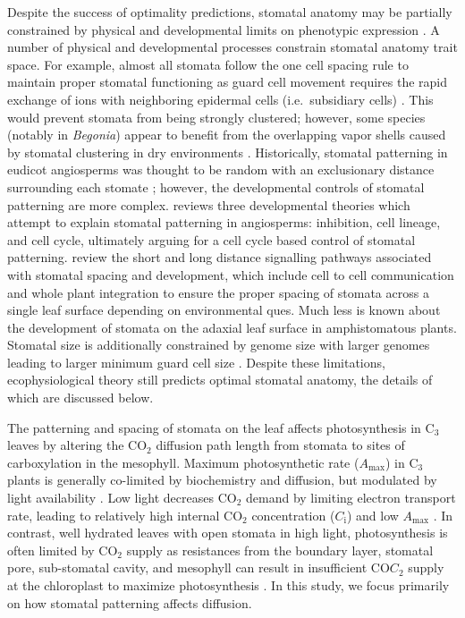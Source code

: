 \documentclass[webpdf,large,modern,unnumsec,namedate]{oup-authoring-template}
\begin{document}
Despite the success of optimality predictions, stomatal anatomy may be
partially constrained by physical and developmental limits on phenotypic
expression
\citep{croxdale_stomatal_2000, harrison_influence_2020, muir_how_2023}.
A number of physical and developmental processes constrain stomatal
anatomy trait space. For example, almost all stomata follow the one cell
spacing rule to maintain proper stomatal functioning as guard cell
movement requires the rapid exchange of ions with neighboring epidermal
cells (i.e.~subsidiary cells)
\citep{geisler_oriented_2000, dow_physiological_2014}. This would
prevent stomata from being strongly clustered; however, some species
(notably in \emph{Begonia}) appear to benefit from the overlapping vapor
shells caused by stomatal clustering in dry environments
\citep{yi_gan_stomatal_2010, lehmann_effects_2015, papanatsiou_stomatal_2017}.
Historically, stomatal patterning in eudicot angiosperms was thought to
be random with an exclusionary distance surrounding each stomate
\citep{sachs_developmental_1974}; however, the developmental controls of
stomatal patterning are more complex. \citet{croxdale_stomatal_2000}
reviews three developmental theories which attempt to explain stomatal
patterning in angiosperms: inhibition, cell lineage, and cell cycle,
ultimately arguing for a cell cycle based control of stomatal
patterning. \citet{pillitteri_mechanisms_2012} review the short and long
distance signalling pathways associated with stomatal spacing and
development, which include cell to cell communication and whole plant
integration to ensure the proper spacing of stomata across a single leaf
surface depending on environmental ques. Much less is known about the
development of stomata on the adaxial leaf surface in amphistomatous
plants. Stomatal size is additionally constrained by genome size with
larger genomes leading to larger minimum guard cell size
\citep{jordan_environmental_2015, roddy_scaling_2020}. Despite these
limitations, ecophysiological theory still predicts optimal stomatal
anatomy, the details of which are discussed below.

The patterning and spacing of stomata on the leaf affects photosynthesis
in C\(_3\) leaves by altering the CO\(_2\) diffusion path length from
stomata to sites of carboxylation in the mesophyll. Maximum
photosynthetic rate (\(A_\text{max}\)) in C\(_3\) plants is generally
co-limited by biochemistry and diffusion, but modulated by light
availability
\citep{parkhurst_intercellular_1990, manter_ci_2004, carriqui_diffusional_2015}.
Low light decreases CO\(_2\) demand by limiting electron transport rate,
leading to relatively high internal CO\(_2\) concentration
(\(C_\text{i}\)) and low \(A_\text{max}\) \citep{kaiser_metabolic_2016}.
In contrast, well hydrated leaves with open stomata in high light,
photosynthesis is often limited by CO\(_2\) supply as resistances from
the boundary layer, stomatal pore, sub-stomatal cavity, and mesophyll
can result in insufficient CO\(C_2\) supply at the chloroplast to
maximize photosynthesis
\citep{farquhar_biochemical_1980, lehmeier_cell_2017}. In this study, we
focus primarily on how stomatal patterning affects diffusion.
\end{document}
